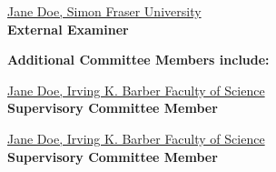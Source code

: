 \documentclass[msc,oneside]{ubcthesis}%
\begin{document}
\vspace{\linespace}

\noindent\underline{Jane Doe, Simon Fraser University} 
\\
\textbf{External Examiner}

\vspace{2\linespace}

\noindent\textbf{Additional Committee Members include:}

\vspace{\linespace}

\noindent\underline{Jane Doe, Irving K. Barber Faculty of Science} 
\\
\textbf{Supervisory Committee Member}

\vspace{\linespace}

\noindent\underline{Jane Doe, Irving K. Barber Faculty of Science} 
\\
\textbf{Supervisory Committee Member}

\normalsize

\newpage


\begin{abstract}                %
The abstract:
\begin{itemize}
    \item Is a concise and accurate summary of the thesis.
    \item Should state the problem, the methods of investigation, and the general conclusions.
    \item Must not contain tables, graphs or illustrations.
    \item Must not exceed 350 words.
    \item Should contain keywords that will facilitate automated information retrieval.
    \item Must be the only abstract in the thesis.
\end{itemize}


\end{abstract}
\end{document}
